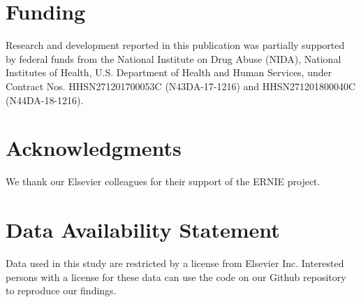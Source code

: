 \documentclass[11pt, oneside]{article}   	%
\begin{document}
\section*{Funding} Research and development reported in this publication was partially supported by federal funds from the National Institute on Drug Abuse (NIDA), National Institutes of Health, U.S. Department of Health and Human Services, under Contract Nos. HHSN271201700053C (N43DA-17-1216) and HHSN271201800040C (N44DA-18-1216).

\section*{Acknowledgments}
We thank our Elsevier colleagues for their support of the ERNIE project. 

\section*{Data Availability Statement}
Data used in this study are restricted by a license from Elsevier Inc. Interested persons with a license for these data can use the code on our Github repository~\citep{Korobskiy2019} to reproduce our findings. 

%  
 

\end{document}
